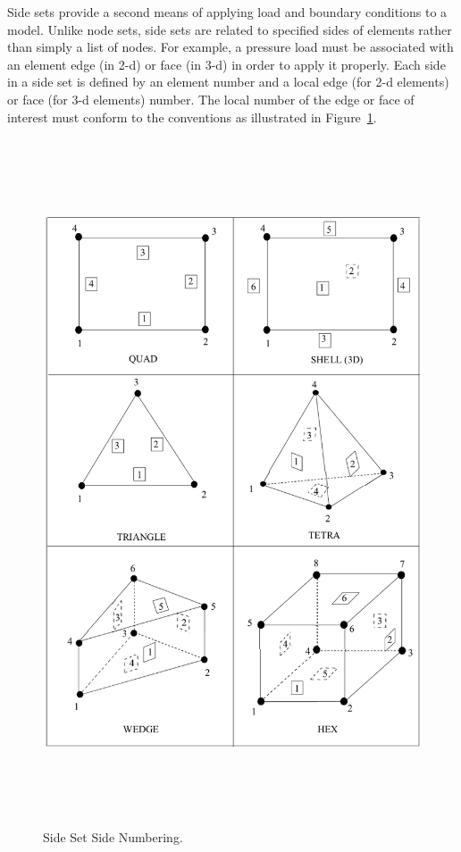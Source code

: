 Side sets provide a second means of applying load and boundary
conditions to a model. Unlike node sets, side sets are related to
specified sides of elements rather than simply a list of nodes. For
example, a pressure load must be associated with an element edge (in
2-d) or face (in 3-d) in order to apply it properly. Each side in a
side set is defined by an element number and a local edge (for 2-d
elements) or face (for 3-d elements) number. The local number of the
edge or face of interest must conform to the conventions as
illustrated in Figure~\ref{f:SideSetNumbering}.
\begin{figure}[htbp]
\begin{center}
\includegraphics[width=6.250in, height=8.000in]{figures/SideSetNumbering.png}
\caption{Side Set Side Numbering.}\label{f:SideSetNumbering}
\end{center}
\end{figure}

